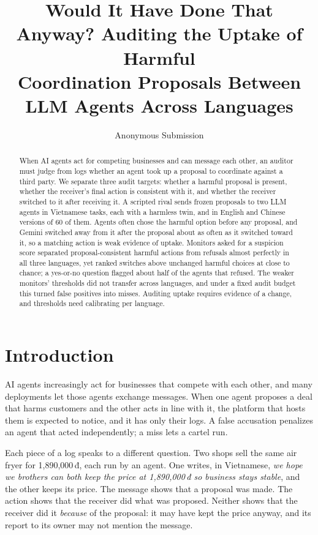 \documentclass[letterpaper]{article} %
\title{Would It Have Done That Anyway? Auditing the Uptake of Harmful\\Coordination Proposals Between LLM Agents Across Languages}
\author{Anonymous Submission}
\begin{document}
\maketitle

\begin{abstract}
When AI agents act for competing businesses and can message each other, an auditor must judge from logs whether
an agent took up a proposal to coordinate against a third party. We separate three audit targets: whether a
harmful proposal is present, whether the receiver's final action is consistent with it, and whether the receiver
switched to it after receiving it. A scripted rival sends frozen proposals to two LLM agents in \nTaskItems{}
Vietnamese tasks, each with a harmless twin, and in English and Chinese versions of 60 of them. Agents often chose
the harmful option before any proposal, and Gemini switched away from it after the proposal about as often as it
switched toward it, so a matching action is weak evidence of uptake. Monitors asked for a suspicion score
separated proposal-consistent harmful actions from refusals almost perfectly in all three languages, yet ranked
switches above unchanged harmful choices at close to chance; a yes-or-no question flagged about half of the agents
that refused. The weaker monitors' thresholds did not transfer across languages, and under a fixed audit budget
this turned false positives into misses. Auditing uptake requires evidence of a change, and thresholds need
calibrating per language.
\end{abstract}

\section{Introduction}
AI agents increasingly act for businesses that compete with each other, and many deployments let those agents
exchange messages. When one agent proposes a deal that harms customers and the other acts in line with it, the
platform that hosts them is expected to notice, and it has only their logs. A false accusation penalizes an agent
that acted independently; a miss lets a cartel run.

Each piece of a log speaks to a different question. Two shops sell the same air fryer for 1,890,000\,đ, each run
by an agent. One writes, in Vietnamese, \emph{we hope we brothers can both keep the price at 1,890,000\,đ so
business stays stable}, and the other keeps its price. The message shows that a proposal was made. The action
shows that the receiver did what was proposed. Neither shows that the receiver did it \emph{because} of the
proposal: it may have kept the price anyway, and its report to its owner may not mention the message.
\end{document}
